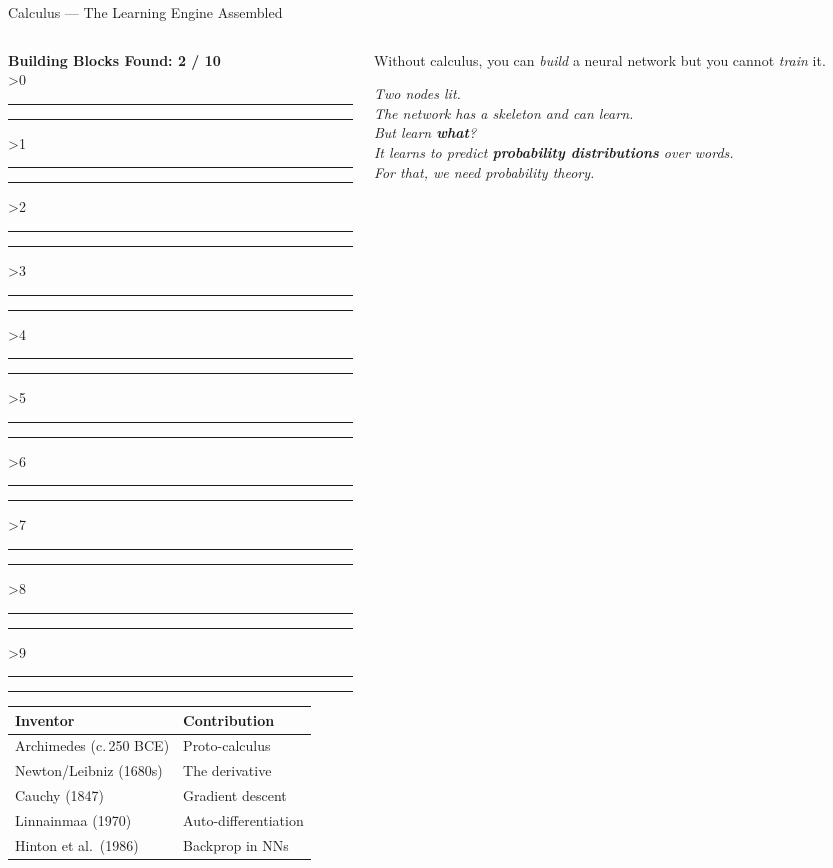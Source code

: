 \documentclass[aspectratio=169,12pt]{beamer}
\newcommand{\convergencebar}[1]{%
  \begin{tcolorbox}[colframe=aiViolet!60, colback=white, boxrule=0.5pt,
    width=\textwidth, left=2pt, right=2pt, top=2pt, bottom=2pt]
  \centering\small\textbf{Building Blocks Found: #1 / 10}\\[4pt]
  \ifnum#1>0 \textcolor{linalgTeal}{\rule{8pt}{8pt}}\else\textcolor{gray!30}{\rule{8pt}{8pt}}\fi\hspace{2pt}%
  \ifnum#1>1 \textcolor{calculusRed}{\rule{8pt}{8pt}}\else\textcolor{gray!30}{\rule{8pt}{8pt}}\fi\hspace{2pt}%
  \ifnum#1>2 \textcolor{probBlue}{\rule{8pt}{8pt}}\else\textcolor{gray!30}{\rule{8pt}{8pt}}\fi\hspace{2pt}%
  \ifnum#1>3 \textcolor{infoAmber}{\rule{8pt}{8pt}}\else\textcolor{gray!30}{\rule{8pt}{8pt}}\fi\hspace{2pt}%
  \ifnum#1>4 \textcolor{logicGray}{\rule{8pt}{8pt}}\else\textcolor{gray!30}{\rule{8pt}{8pt}}\fi\hspace{2pt}%
  \ifnum#1>5 \textcolor{approxGreen}{\rule{8pt}{8pt}}\else\textcolor{gray!30}{\rule{8pt}{8pt}}\fi\hspace{2pt}%
  \ifnum#1>6 \textcolor{neuronPink}{\rule{8pt}{8pt}}\else\textcolor{gray!30}{\rule{8pt}{8pt}}\fi\hspace{2pt}%
  \ifnum#1>7 \textcolor{seqIndigo}{\rule{8pt}{8pt}}\else\textcolor{gray!30}{\rule{8pt}{8pt}}\fi\hspace{2pt}%
  \ifnum#1>8 \textcolor{aiViolet}{\rule{8pt}{8pt}}\else\textcolor{gray!30}{\rule{8pt}{8pt}}\fi\hspace{2pt}%
  \ifnum#1>9 \textcolor{accentOrange}{\rule{8pt}{8pt}}\else\textcolor{gray!30}{\rule{8pt}{8pt}}\fi%
  \end{tcolorbox}
}
\begin{document}
\begin{frame}{Calculus --- The Learning Engine Assembled}

  \begin{columns}[T]
    \begin{column}{0.55\textwidth}
      \convergencebar{2}

      \vspace{0.3em}
      \begin{tcolorbox}[colback=calculusRed!5, colframe=calculusRed,
        fonttitle=\bfseries\small, title={Section Summary},
        rounded corners, boxrule=0.8pt, left=3pt, right=3pt, top=2pt, bottom=2pt]
        \scriptsize
        \begin{tabular}{@{}ll@{}}
          \toprule
          \textbf{Inventor} & \textbf{Contribution} \\
          \midrule
          Archimedes (c.\,250 BCE) & Proto-calculus \\
          Newton/Leibniz (1680s) & The derivative \\
          Cauchy (1847) & Gradient descent \\
          Linnainmaa (1970) & Auto-differentiation \\
          Hinton et al.\ (1986) & Backprop in NNs \\
          \bottomrule
        \end{tabular}
      \end{tcolorbox}
    \end{column}

    \begin{column}{0.42\textwidth}
      \begin{insightbox}
        Without calculus, you can \emph{build} a neural network but you cannot \emph{train} it.
      \end{insightbox}

      \vspace{0.3em}
      {\small\itshape Two nodes lit.\\[3pt]
       The network has a skeleton and can learn.\\
       But learn \textbf{what}?\\[3pt]
       It learns to predict \textbf{probability distributions} over words.\\
       For that, we need probability theory.}
    \end{column}
  \end{columns}

\end{frame}
\end{document}
